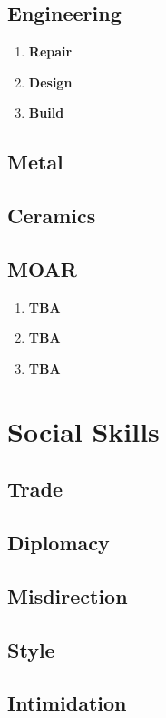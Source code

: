 \subsection{Engineering}\label{subsec:engineering}
\begin{enumerate}[label= -]
    \item \textbf{Repair} 
    \item \textbf{Design} 
    \item \textbf{Build} 
\end{enumerate}
\subsection{Metal}\label{subsec:metal}
\subsection{Ceramics}\label{subsec:ceramics}
\subsection{MOAR}
\begin{enumerate}[label= -]
    \item \textbf{TBA} 
    \item \textbf{TBA} 
    \item \textbf{TBA} 
\end{enumerate}

\section{Social Skills}\label{sec:charisma-skills}
\subsection{Trade}\label{subsec:trade2}
\subsection{Diplomacy}\label{subsec:diplomacy}
\subsection{Misdirection}\label{subsec:misdirection}
\subsection{Style}\label{subsec:style}
\subsection{Intimidation}\label{subsec:intimidation}
